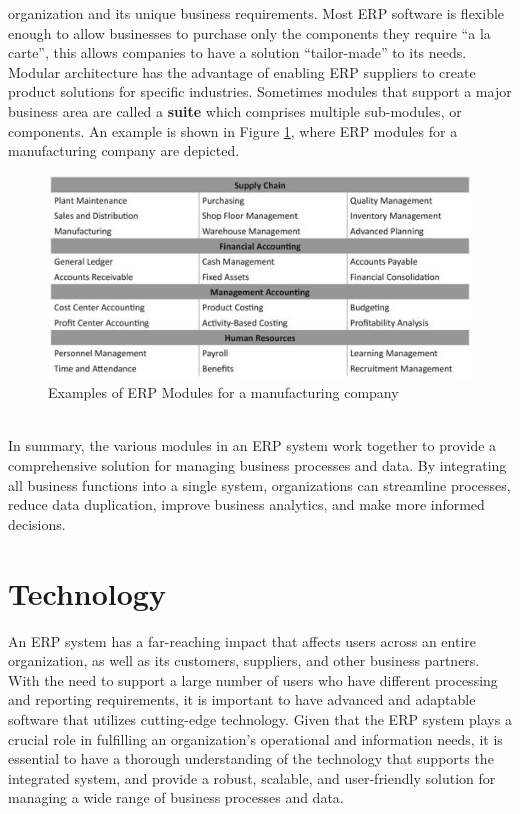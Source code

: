 organization and its unique business requirements. Most ERP software is flexible enough to allow
businesses to purchase only the components they require “a la carte”, this allows companies to have
a solution “tailor-made” to its needs. Modular architecture has the advantage of enabling ERP
suppliers to create product solutions for specific industries. Sometimes modules that support a
major business area are called a \textbf{suite} which comprises multiple sub-modules, or components.
An example is shown in Figure \ref{fig:3_ERP_Modules}, where ERP modules for a manufacturing company
are depicted.
\begin{figure}
    \centering
    \includegraphics[scale=0.75]{Pictures/3_ERP_Modules.jpg}
    \caption{Examples of ERP Modules for a manufacturing company}
    \label{fig:3_ERP_Modules}
\end{figure}
\\
In summary, the various modules in an ERP system work together to provide a comprehensive solution
for managing business processes and data. By integrating all business functions into a single
system, organizations can streamline processes, reduce data duplication, improve business analytics,
and make more informed decisions.

\section{Technology}
An ERP system has a far-reaching impact that affects users across an entire organization, as well as
its customers, suppliers, and other business partners. With the need to support a large number of
users who have different processing and reporting requirements, it is important to have advanced and
adaptable software that utilizes cutting-edge technology. Given that the ERP system plays a crucial
role in fulfilling an organization's operational and information needs, it is essential to have a
thorough understanding of the technology that supports the integrated system, and provide a robust,
scalable, and user-friendly solution for managing a wide range of business processes and data.

